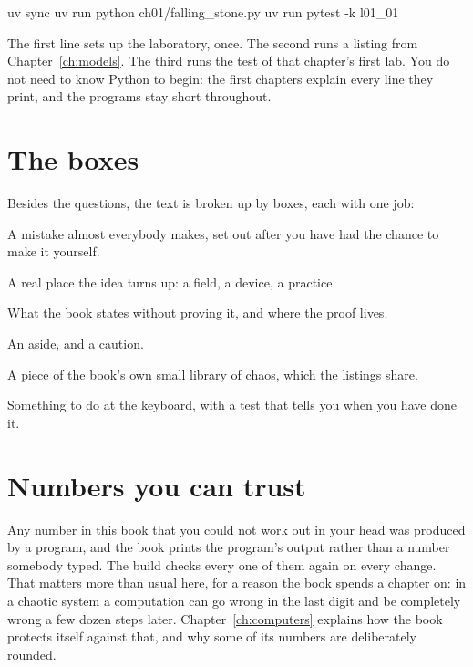 \begin{shellcmd}
uv sync
uv run python ch01/falling_stone.py
uv run pytest -k l01_01
\end{shellcmd}

The first line sets up the laboratory, once. The second runs a listing from
Chapter~\ref{ch:models}. The third runs the test of that chapter's first
lab. You do not need to know Python to begin: the first chapters explain
every line they print, and the programs stay short throughout.

\section*{The boxes}

Besides the questions, the text is broken up by boxes, each with one job:

\begin{description}[leftmargin=1.2em, itemsep=2pt]
  \item[\lblTrap.] A mistake almost everybody makes, set out after you have
    had the chance to make it yourself.
  \item[\lblWorld.] A real place the idea turns up: a field, a device, a
    practice.
  \item[\lblRigour.] What the book states without proving it, and where the
    proof lives.
  \item[\lblNote, \lblWarning.] An aside, and a caution.
  \item[\lblProject.] A piece of the book's own small library of chaos, which
    the listings share.
  \item[\lblLab.] Something to do at the keyboard, with a test that tells
    you when you have done it.
\end{description}

\section*{Numbers you can trust}

Any number in this book that you could not work out in your head was
produced by a program, and the book prints the program's output rather than
a number somebody typed. The build checks every one of them again on every
change. That matters more than usual here, for a reason the book spends a
chapter on: in a chaotic system a computation can go wrong in the last digit
and be completely wrong a few dozen steps later. Chapter~\ref{ch:computers}
explains how the book protects itself against that, and why some of its
numbers are deliberately rounded.

